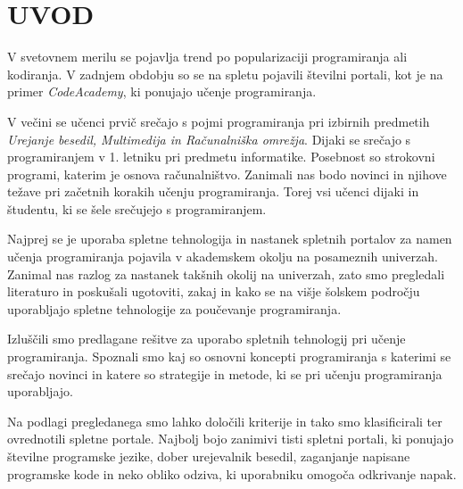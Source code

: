 \section{UVOD}
\label{sec:Uvod}


V svetovnem merilu se pojavlja trend po popularizaciji programiranja
ali kodiranja. V zadnjem obdobju so se na spletu pojavili številni
portali, kot je na primer \emph{CodeAcademy}, ki ponujajo učenje
programiranja. 



V večini se učenci prvič srečajo s pojmi programiranja pri izbirnih
predmetih \emph{Urejanje besedil, Multimedija in Računalniška
  omrežja}. Dijaki se srečajo s programiranjem v 1. letniku pri
predmetu informatike. Posebnost so strokovni programi, katerim je
osnova računalništvo. Zanimali nas bodo novinci in njihove težave pri
začetnih korakih učenju programiranja. Torej vsi učenci dijaki in
študentu, ki se šele srečujejo s programiranjem.

Najprej se je uporaba spletne tehnologija in nastanek spletnih
portalov za namen učenja programiranja pojavila v akademskem okolju na
posameznih univerzah. Zanimal nas razlog za nastanek takšnih okolij
na univerzah, zato smo pregledali literaturo in poskušali ugotoviti,
zakaj in kako se na višje šolskem področju uporabljajo spletne
tehnologije za poučevanje programiranja.

Izluščili smo predlagane rešitve za uporabo spletnih tehnologij pri
učenje programiranja. Spoznali smo kaj so osnovni koncepti
programiranja s katerimi se srečajo novinci in katere so strategije in
metode, ki se pri učenju programiranja uporabljajo.

Na podlagi pregledanega smo lahko določili kriterije in tako smo
klasificirali ter ovrednotili spletne portale. Najbolj bojo zanimivi
tisti spletni portali, ki ponujajo številne programske jezike, dober
urejevalnik besedil, zaganjanje napisane programske kode in neko
obliko odziva, ki uporabniku omogoča odkrivanje napak.


